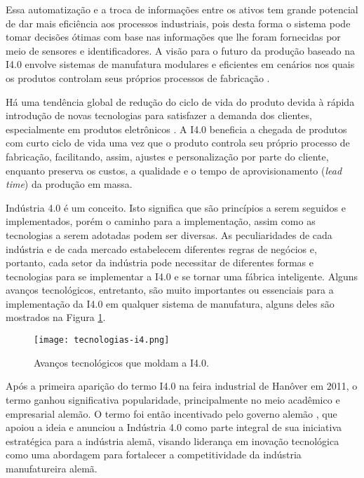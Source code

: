	Essa automatização e a troca de informações entre os ativos tem grande potencial de dar mais eficiência aos processos industriais, pois desta forma o sistema pode tomar decisões ótimas com base nas informações que lhe foram fornecidas por meio de sensores e identificadores. A visão para o futuro da produção baseado na I4.0 envolve sistemas de manufatura modulares e eficientes em cenários nos quais os produtos controlam seus próprios processos de fabricação \cite{lasi2014industryfour}.
	
	Há uma tendência global de redução do ciclo de vida do produto devida à rápida introdução de novas tecnologias para satisfazer a demanda dos clientes, especialmente em produtos eletrônicos \cite{trappey2008lifecycle}. A I4.0 beneficia a chegada de produtos com curto ciclo de vida uma vez que o produto controla seu próprio processo de fabricação, facilitando, assim, ajustes e personalização por parte do cliente, enquanto preserva os custos, a qualidade e o tempo de aprovisionamento (\textit{lead time}) da produção em massa.
	
	Indústria 4.0 é um conceito. Isto significa que são princípios a serem seguidos e implementados, porém o caminho para a implementação, assim como as tecnologias a serem adotadas podem ser diversas. As peculiaridades de cada indústria e de cada mercado estabelecem diferentes regras de negócios e, portanto, cada setor da indústria pode necessitar de diferentes formas e tecnologias para se implementar a I4.0 e se tornar uma fábrica inteligente. Alguns avanços tecnológicos, entretanto, são muito importantes ou essenciais para a implementação da I4.0 em qualquer sistema de manufatura, alguns deles são mostrados na Figura \ref{fig:tecnologias-i4}.
	
	\begin{figure}[H]
		\centering
		\caption{Avanços tecnológicos que moldam a I4.0.}
		\texttt{[image: tecnologias-i4.png]}
		\label{fig:tecnologias-i4}
	\end{figure}

	Após a primeira aparição do termo I4.0 na feira industrial de Hanôver em 2011, o termo ganhou significativa popularidade, principalmente no meio acadêmico e empresarial alemão. O termo foi então incentivado pelo governo alemão \cite{lasi2014industryfour, kagermann2013recommendations}, que apoiou a ideia e anunciou a Indústria 4.0 como parte integral de sua iniciativa estratégica para a indústria alemã, visando liderança em inovação tecnológica \cite{drath2014industrie} como uma abordagem para fortalecer a competitividade da indústria manufatureira alemã.	


